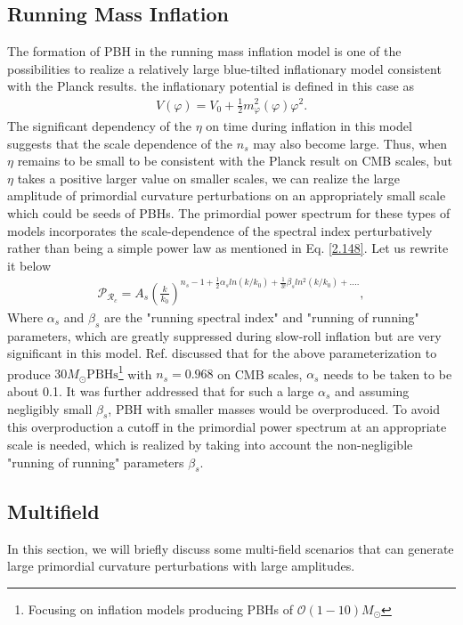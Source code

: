 \subsection{Running  Mass Inflation}
 The formation of PBH in the running mass inflation model is one of the possibilities to realize a relatively large blue-tilted inflationary model consistent with the Planck results. the inflationary potential is defined in this case as 
 \begin{align}
     V(\varphi) = V_{0} + \frac{1}{2}m_{\varphi}^{2}(\varphi)\varphi^{2} \label{3.43}.
 \end{align}
The significant dependency of the $\eta$ on time during inflation in this model suggests that the scale dependence of the $n_s$ may also become large. Thus, when $\eta$ remains to be small to be consistent with the Planck result on CMB scales, but $\eta$ takes a positive larger value on smaller scales, we can realize the large
 amplitude of primordial curvature perturbations on an appropriately small scale which could be seeds of PBHs. The primordial power spectrum for these types of models incorporates the scale-dependence of the spectral index perturbatively rather than being a simple power law as mentioned in Eq. \ref{2.148}. Let us rewrite it below
 \begin{align}
    \mathcal{P}_{\mathcal{R}_c}  = A_s (\frac{k}{k_0})^{n_s -1 + \frac{1}{2}\alpha_{s} ln(k/k_0)+ \frac{1}{3!}\beta_{s}ln^2(k/k_0) + ....}, \label{3.44} 
 \end{align}
Where $\alpha_{s}$ and $\beta_{s}$ are the "running spectral index" and "running of running" parameters, which are greatly suppressed during slow-roll inflation but are very significant in this model. Ref. \cite{Sasaki_2018} discussed that for the above parameterization to produce $30M_{\odot} \mathrm{PBHs}$\footnote{Focusing on inflation models producing PBHs of $\mathcal{O}(1-10)M_{\odot}$} with $n_s = 0.968$ on CMB scales, $\alpha_{s}$ needs to be taken to be about 0.1.
 It was further addressed that for such a large $\alpha_{s}$ and assuming negligibly small $\beta_s$, PBH with smaller masses would be overproduced. To avoid this overproduction a cutoff in the primordial power spectrum at an appropriate scale is needed, which is realized by taking into account the non-negligible "running of running" parameters $\beta_s$. 


\subsection{Multifield}
In this section, we will briefly discuss some multi-field scenarios that can generate large primordial curvature perturbations with large amplitudes.

